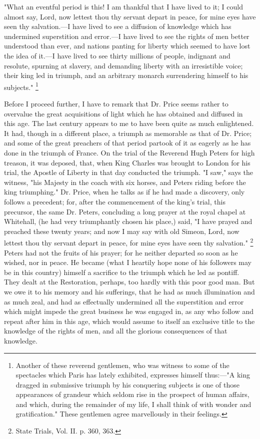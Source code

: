 "What an eventful period is this! I am thankful that I have lived to it; I could almost say, Lord, now lettest thou thy servant depart in peace, for mine eyes have seen thy salvation.—I have lived to see a diffusion of knowledge which has undermined superstition and error.—I have lived to see the rights of men better understood than ever, and nations panting for liberty which seemed to have lost the idea of it.—I have lived to see thirty millions of people, indignant and resolute, spurning at slavery, and demanding liberty with an irresistible voice; their king led in triumph, and an arbitrary monarch surrendering himself to his subjects."
\footnote{ Another of these reverend gentlemen, who was witness to some of the spectacles which Paris has lately exhibited, expresses himself thus:—"A king dragged in submissive triumph by his conquering subjects is one of those appearances of grandeur which seldom rise in the prospect of human affairs, and which, during the remainder of my life, I shall think of with wonder and gratification." These gentlemen agree marvellously in their feelings.}


Before I proceed further, I have to remark that Dr. Price seems rather to overvalue the great acquisitions of light which he has obtained and diffused in this age. The last century appears to me to have been quite as much enlightened. It had, though in a different place, a triumph as memorable as that of Dr. Price; and some of the great preachers of that period partook of it as eagerly as he has done in the triumph of France. On the trial of the Reverend Hugh Peters for high treason, it was deposed, that, when King Charles was brought to London for his trial, the Apostle of Liberty in that day conducted the triumph. "I saw," says the witness, "his Majesty in the coach with six horses, and Peters riding before the king triumphing." Dr. Price, when he talks as if he had made a discovery, only follows a precedent; for, after the commencement of the king's trial, this precursor, the same Dr. Peters, concluding a long prayer at the royal chapel at Whitehall, (he had very triumphantly chosen his place,) said, "I have prayed and preached these twenty years; and now I may say with old Simeon, Lord, now lettest thou thy servant depart in peace, for mine eyes have seen thy salvation."
\footnote{ State Trials, Vol. II. p. 360, 363.}
 Peters had not the fruits of his prayer; for he neither departed so soon as he wished, nor in peace. He became (what I heartily hope none of his followers may be in this country) himself a sacrifice to the triumph which he led as pontiff. They dealt at the Restoration, perhaps, too hardly with this poor good man. But we owe it to his memory and his sufferings, that he had as much illumination and as much zeal, and had as effectually undermined all the superstition and error which might impede the great business he was engaged in, as any who follow and repeat after him in this age, which would assume to itself an exclusive title to the knowledge of the rights of men, and all the glorious consequences of that knowledge.

